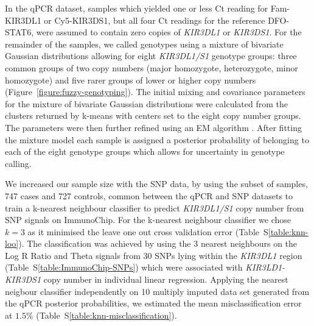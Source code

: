 In the qPCR dataset, samples which yielded one or less Ct reading for Fam-KIR3DL1 or Cy5-KIR3DS1, but all four Ct readings for the reference DFO-STAT6,
were assumed to contain zero copies of \emph{KIR3DL1} or \emph{KIR3DS1}.
For the remainder of the samples, we called genotypes using a mixture of bivariate Gaussian distributions allowing for eight \emph{KIR3DL1/S1} genotype groups:
three common groups of two copy numbers (major homozygote, heterozygote, minor homozygote) and five rarer groups of lower or higher copy numbers (Figure~\ref{figure:fuzzy-genotyping}).
The initial mixing and covariance parameters for the mixture of bivariate Gaussian distributions were calculated from the clusters returned by k-means
with centers set to the eight copy number groups.
The parameters were then further refined using an EM algorithm \citep{Young:2009ty}.
After fitting the mixture model each sample is assigned a posterior probability of belonging to each of the eight genotype groups which allows for uncertainty in genotype calling.

We increased our sample size with the SNP data,
by using the subset of samples, 747 cases and 727 controls, common between the qPCR and SNP datasets to train a k-nearest neighbour classifier
to predict \emph{KIR3DL1/S1} copy number from  SNP signals on ImmunoChip.
For the k-nearest neighbour classifier we chose $k=3$ as it minimised the leave one out cross validation error (Table~S\ref{table:knn-loo}).
The classification was achieved by using the 3 nearest neighbours on the Log R Ratio and Theta signals from 30 SNPs lying within the \emph{KIR3DL1} region (Table~S\ref{table:ImmunoChip-SNPs}) which were associated with \emph{KIR3LD1-KIR3DS1} copy number in individual linear regression.
Applying the nearest neigbour classifier independently on 10 multiply imputed data set generated from the qPCR posterior probabilities,
we estimated the mean misclassification error at $1.5\%$ (Table~S\ref{table:knn-misclassification}). 




